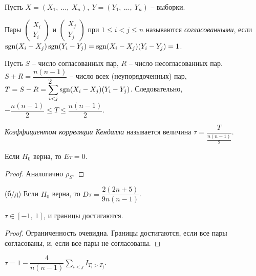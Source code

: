 Пусть $\displaystyle X=( X_{1} ,\ \dotsc ,\ X_{n}) ,\ Y=( Y_{1} ,\ \dotsc ,\ Y_{n})$ -- выборки.
\begin{definition}
    Пары $\displaystyle \begin{pmatrix}
    X_{i}\\
    Y_{i}
    \end{pmatrix}$ и $\displaystyle \begin{pmatrix}
    X_{j}\\
    Y_{j}
    \end{pmatrix}$ при $\displaystyle 1\leqslant i< j\leqslant n$ называются \textit{согласованными}, если $\displaystyle \operatorname{sgn}( X_{i} -X_{j})\operatorname{sgn}( Y_{i} -Y_{j}) =\operatorname{sgn}( X_{i} -X_{j})( Y_{i} -Y_{j}) =1$.
\end{definition}
Пусть $\displaystyle S$ -- число согласованных пар, $\displaystyle R$ -- число несогласованных пар. $\displaystyle S+R=\dfrac{n( n-1)}{2}$ -- число всех (неупорядоченных) пар, $\displaystyle T=S-R=\sum _{i< j}\operatorname{sgn}( X_{i} -X_{j})( Y_{i} -Y_{j})$. Следовательно, $\displaystyle -\dfrac{n( n-1)}{2} \leqslant T\leqslant \dfrac{n( n-1)}{2}$.
\begin{definition}
    \textit{Коэффициентом корреляции Кендалла} называется величина $\displaystyle \tau =\dfrac{T}{\frac{n( n-1)}{2}}$.
\end{definition}
\begin{proposition}
    Если $\displaystyle H_{0}$ верна, то $\displaystyle E\tau =0$.
\end{proposition}
\begin{proof}
    Аналогично $\displaystyle \rho _{S}$.
\end{proof}
\begin{proposition}
    (б/д) Если $\displaystyle H_{0}$ верна, то $\displaystyle D\tau =\dfrac{2( 2n+5)}{9n( n-1)}$.
\end{proposition}
\begin{proposition}
    $\displaystyle \tau \in [ -1,\ 1]$, и границы достигаются.
\end{proposition}
\begin{proof}
    Ограниченность очевидна. Границы достигаются, если все пары согласованы, и, если все пары не согласованы.
\end{proof}
\begin{proposition}
    $\displaystyle \tau =1-\dfrac{4}{n( n-1)}\sum _{i< j} I_{T_{i}  >T_{j}}$.
\end{proposition}
